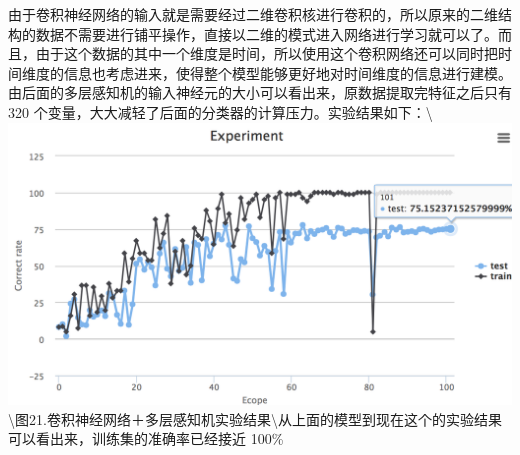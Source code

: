 由于卷积神经网络的输入就是需要经过二维卷积核进行卷积的，所以原来的二维结构的数据不需要进行铺平操作，直接以二维的模式进入网络进行学习就可以了。而且，由于这个数据的其中一个维度是时间，所以使用这个卷积网络还可以同时把时间维度的信息也考虑进来，使得整个模型能够更好地对时间维度的信息进行建模。由后面的多层感知机的输入神经元的大小可以看出来，原数据提取完特征之后只有
320
个变量，大大减轻了后面的分类器的计算压力。实验结果如下：\textbackslash{}\includegraphics{picture/cnn-mlp-experiment.png}\textbackslash{}图21.卷积神经网络＋多层感知机实验结果\textbackslash{}从上面的模型到现在这个的实验结果可以看出来，训练集的准确率已经接近
100\%
